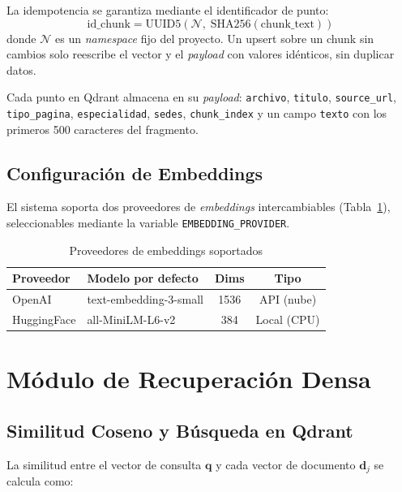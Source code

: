 \documentclass[conference]{IEEEtran}
\newcommand{\code}[1]{\texttt{\small #1}}
\begin{document}
La idempotencia se garantiza mediante el identificador de punto:
\[
\text{id\_chunk} = \mathrm{UUID5}(\mathcal{N},\; \mathrm{SHA256}(\text{chunk\_text}))
\]
donde $\mathcal{N}$ es un \textit{namespace} fijo del proyecto. Un upsert sobre
un chunk sin cambios solo reescribe el vector y el \textit{payload} con valores
idénticos, sin duplicar datos.

Cada punto en Qdrant almacena en su \textit{payload}: \code{archivo},
\code{titulo}, \code{source\_url}, \code{tipo\_pagina}, \code{especialidad},
\code{sedes}, \code{chunk\_index} y un campo \code{texto} con los primeros 500
caracteres del fragmento.

\subsection{Configuración de Embeddings}

El sistema soporta dos proveedores de \textit{embeddings} intercambiables
(Tabla~\ref{tab:emb}), seleccionables mediante la variable
\code{EMBEDDING\_PROVIDER}.

\begin{table}[ht]
\centering
\caption{Proveedores de embeddings soportados}
\label{tab:emb}
\setlength{\tabcolsep}{3.5pt}
\begin{tabular}{@{}llcc@{}}
\toprule
\textbf{Proveedor} & \textbf{Modelo por defecto} & \textbf{Dims} & \textbf{Tipo} \\
\midrule
OpenAI      & text-embedding-3-small & 1536 & API (nube)  \\
HuggingFace & all-MiniLM-L6-v2       & 384  & Local (CPU) \\
\bottomrule
\end{tabular}
\end{table}

\section{Módulo de Recuperación Densa}
\label{sec:rag}

\subsection{Similitud Coseno y Búsqueda en Qdrant}

La similitud entre el vector de consulta $\mathbf{q}$ y cada vector de documento
$\mathbf{d}_j$ se calcula como:
\end{document}
